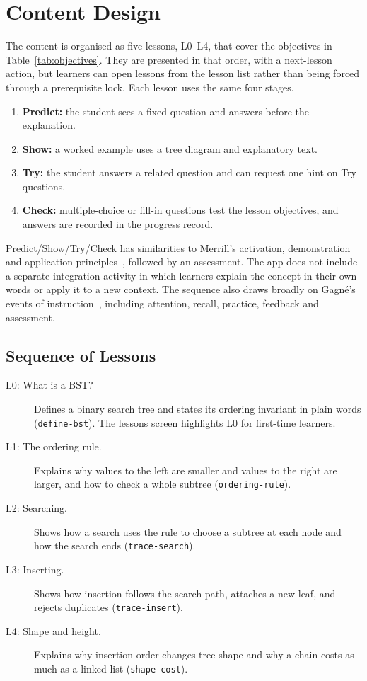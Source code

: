 \section{Content Design}\label{sec:id-content}

The content is organised as five lessons, L0--L4, that cover the objectives in Table~\ref{tab:objectives}. They are presented in that order, with a next-lesson action, but learners can open lessons from the lesson list rather than being forced through a prerequisite lock. Each lesson uses the same four stages.

\begin{enumerate}
    \item \textbf{Predict:} the student sees a fixed question and answers before the explanation.
    \item \textbf{Show:} a worked example uses a tree diagram and explanatory text.
    \item \textbf{Try:} the student answers a related question and can request one hint on Try questions.
    \item \textbf{Check:} multiple-choice or fill-in questions test the lesson objectives, and answers are recorded in the progress record.
\end{enumerate}

Predict/Show/Try/Check has similarities to Merrill's activation, demonstration and application principles~\cite{Merrill2002}, followed by an assessment. The app does not include a separate integration activity in which learners explain the concept in their own words or apply it to a new context. The sequence also draws broadly on Gagné's events of instruction~\cite{gagné1985conditions}, including attention, recall, practice, feedback and assessment.

\subsection{Sequence of Lessons}
\begin{description}
    \item[L0: What is a BST?] Defines a binary search tree and states its ordering invariant in plain words (\texttt{define-bst}). The lessons screen highlights L0 for first-time learners.
    \item[L1: The ordering rule.] Explains why values to the left are smaller and values to the right are larger, and how to check a whole subtree (\texttt{ordering-rule}).
    \item[L2: Searching.] Shows how a search uses the rule to choose a subtree at each node and how the search ends (\texttt{trace-search}).
    \item[L3: Inserting.] Shows how insertion follows the search path, attaches a new leaf, and rejects duplicates (\texttt{trace-insert}).
    \item[L4: Shape and height.] Explains why insertion order changes tree shape and why a chain costs as much as a linked list (\texttt{shape-cost}).
\end{description}

